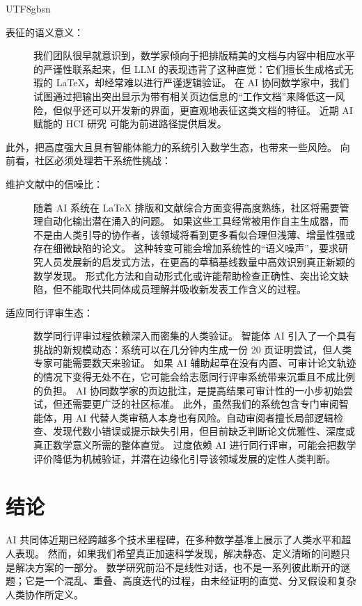 \documentclass[11pt, a4paper, copyright, gdm]{google}
\begin{document}
\begin{CJK*}{UTF8}{gbsn}
\begin{description}
    \item[表征的语义意义：] 我们团队很早就意识到，数学家倾向于把排版精美的文档与内容中相应水平的严谨性联系起来，但 LLM 的表现违背了这种直觉：它们擅长生成格式无瑕的 LaTeX，却经常难以进行严谨逻辑验证。
    在 AI 协同数学家中，我们试图通过把输出突出显示为带有相关页边信息的“工作文档”来降低这一风险，但似乎还可以开发新的界面，更直观地表征这类文档的特征。
    近期 AI 赋能的 HCI 研究 \citep[e.g.,][]{pair2025lumi} 可能为前进路径提供启发。
    
\end{description}

此外，把高度强大且具有智能体能力的系统引入数学生态，也带来一些风险。
向前看，社区必须处理若干系统性挑战：

\begin{description}
%
    
    \item[维护文献中的信噪比：] 随着 AI 系统在 LaTeX 排版和文献综合方面变得高度熟练，社区将需要管理自动化输出潜在涌入的问题。
    如果这些工具经常被用作自主生成器，而不是由人类引导的协作者，该领域将看到更多看似合理但浅薄、增量性强或存在细微缺陷的论文。
    这种转变可能会增加系统性的“语义噪声”，要求研究人员发展新的启发式方法，在更高的草稿基线数量中高效识别真正新颖的数学发现。
    形式化方法和自动形式化或许能帮助检查正确性、突出论文缺陷，但不能取代共同体成员理解并吸收新发表工作含义的过程。
    
    \item[适应同行评审生态：] 数学同行评审过程依赖深入而密集的人类验证。
    智能体 AI 引入了一个具有挑战的新规模动态：系统可以在几分钟内生成一份 20 页证明尝试，但人类专家可能需要数天来验证。
    如果 AI 辅助起草在没有内置、可审计论文轨迹的情况下变得无处不在，它可能会给志愿同行评审系统带来沉重且不成比例的负担。
    AI 协同数学家的页边批注，是提高结果可审计性的一小步初始尝试，但还需要更广泛的社区标准。
    此外，虽然我们的系统包含专门审阅智能体，用 AI 代替人类审稿人本身也有风险。自动审阅者擅长局部逻辑检查、发现代数小错误或提示缺失引用，但目前缺乏判断论文优雅性、深度或真正数学意义所需的整体直觉。
    过度依赖 AI 进行同行评审，可能会把数学评价降低为机械验证，并潜在边缘化引导该领域发展的定性人类判断。

\end{description}

\section{结论}

AI 共同体近期已经跨越多个技术里程碑，在多种数学基准上展示了人类水平和超人表现。
然而，如果我们希望真正加速科学发现，解决静态、定义清晰的问题只是解决方案的一部分。
数学研究前沿不是线性对话，也不是一系列彼此断开的谜题；它是一个混乱、重叠、高度迭代的过程，由未经证明的直觉、分叉假设和复杂人类协作所定义。


\end{CJK*}
\end{document}
